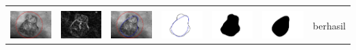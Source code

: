 \begin{table}[H]
\begin{tabular}{|m{0.7in}|m{0.7in}|m{0.7in}|m{0.7in}|m{0.7in}|m{0.7in}|m{0.7in}|}
		&  &  & & & &  \\
		\includegraphics[width=0.7in]{dataset/dataset_3/luka_kuning/ready/23_interp_init.jpg}&
		\includegraphics[width=0.7in]{dataset/dataset_3/luka_kuning/ready/23_interp_ext.jpg}&
		\includegraphics[width=0.7in]{dataset/dataset_3/luka_kuning/ready/23_interp_result.jpg}&
		\includegraphics[width=0.7in]{dataset/dataset_3/luka_kuning/ready/23_gt_r.jpg}&
		\includegraphics[width=0.7in]{dataset/dataset_3/luka_kuning/ready/23_r.jpg}&
		\includegraphics[width=0.7in]{dataset/dataset_3/luka_kuning/ready/23_interp_r.jpg}&
		berhasil\\
		\hline
		

\end{tabular}
\end{table}

